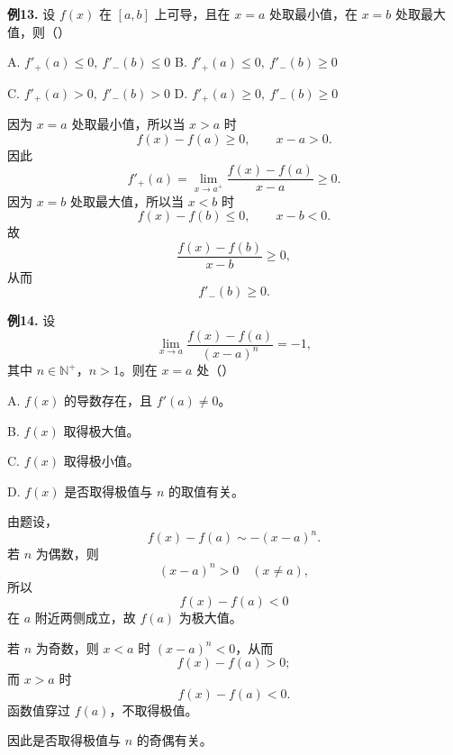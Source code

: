 \begin{problemblock}
\textbf{例13.} 设 \(f(x)\) 在 \([a,b]\) 上可导，且在 \(x=a\) 处取最小值，在 \(x=b\) 处取最大值，则（\quad）

A. \(f'_+(a)\le0,\ f'_-(b)\le0\)
\quad B. \(f'_+(a)\le0,\ f'_-(b)\ge0\)

C. \(f'_+(a)>0,\ f'_-(b)>0\)
\quad D. \(f'_+(a)\ge0,\ f'_-(b)\ge0\)
\end{problemblock}
\begin{solutionblock}
因为 \(x=a\) 处取最小值，所以当 \(x>a\) 时
\[
f(x)-f(a)\ge0,\qquad x-a>0.
\]
因此
\[
f'_+(a)=\lim_{x\to a^+}\frac{f(x)-f(a)}{x-a}\ge0.
\]
因为 \(x=b\) 处取最大值，所以当 \(x<b\) 时
\[
f(x)-f(b)\le0,\qquad x-b<0.
\]
故
\[
\frac{f(x)-f(b)}{x-b}\ge0,
\]
从而
\[
f'_-(b)\ge0.
\]
\end{solutionblock}

\begin{problemblock}
\textbf{例14.} 设
\[
\lim_{x\to a}\frac{f(x)-f(a)}{(x-a)^n}=-1,
\]
其中 \(n\in\mathbb N^+\)，\(n>1\)。则在 \(x=a\) 处（\quad）

A. \(f(x)\) 的导数存在，且 \(f'(a)\ne0\)。

B. \(f(x)\) 取得极大值。

C. \(f(x)\) 取得极小值。

D. \(f(x)\) 是否取得极值与 \(n\) 的取值有关。
\end{problemblock}
\begin{solutionblock}
由题设，
\[
f(x)-f(a)\sim -(x-a)^n.
\]
若 \(n\) 为偶数，则
\[
(x-a)^n>0\quad (x\ne a),
\]
所以
\[
f(x)-f(a)<0
\]
在 \(a\) 附近两侧成立，故 \(f(a)\) 为极大值。

若 \(n\) 为奇数，则 \(x<a\) 时 \((x-a)^n<0\)，从而
\[
f(x)-f(a)>0;
\]
而 \(x>a\) 时
\[
f(x)-f(a)<0.
\]
函数值穿过 \(f(a)\)，不取得极值。

因此是否取得极值与 \(n\) 的奇偶有关。
\end{solutionblock}

